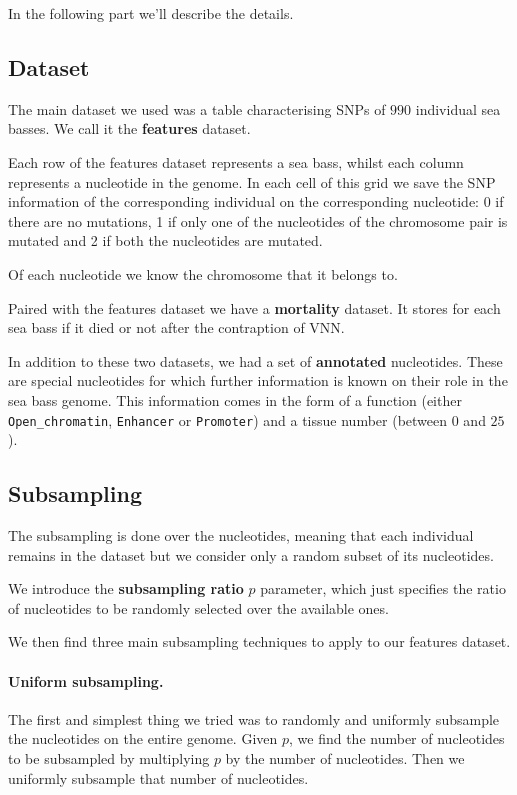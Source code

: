 In the following part we'll describe the details.


\subsection{Dataset}

The main dataset we used was a table characterising SNPs of $990$ individual sea basses. We call it the \textbf{features} dataset.

Each row of the features dataset represents a sea bass, whilst each column represents a nucleotide in the genome.
In each cell of this grid we save the SNP information of the corresponding individual on the corresponding nucleotide: 0 if there are no mutations, 1 if only one of the nucleotides of the chromosome pair is mutated and 2 if both the nucleotides are mutated.


Of each nucleotide we know the chromosome that it belongs to.

Paired with the features dataset we have a \textbf{mortality} dataset. 
It stores for each sea bass if it died or not after the contraption of VNN.

In addition to these two datasets, we had a set of \textbf{annotated} nucleotides.
These are special nucleotides for which further information is known on their role in the sea bass genome.
This information comes in the form of a function (either \texttt{Open\_chromatin}, \texttt{Enhancer} or \texttt{Promoter}) and a tissue number (between $0$ and $25$).


\subsection{Subsampling}

The subsampling is done over the nucleotides, meaning that each individual remains in the dataset but we consider only a random subset of its nucleotides.

We introduce the \textbf{subsampling ratio} $p$ parameter, which just specifies the ratio of nucleotides to be randomly selected over the available ones.

We then find three main subsampling techniques to apply to our features dataset.

\paragraph{Uniform subsampling.}
The first and simplest thing we tried was to randomly and uniformly subsample the nucleotides on the entire genome.
Given $p$, we find the number of nucleotides to be subsampled by multiplying $p$ by the number of nucleotides.
Then we uniformly subsample that number of nucleotides.

